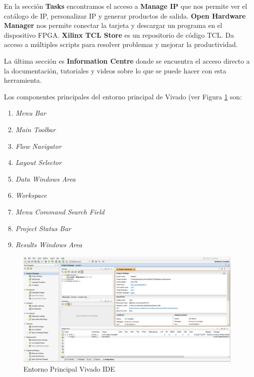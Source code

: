 En la sección \textbf{Tasks} encontramos el acceso a \textbf{Manage IP} que nos permite ver el catálogo de IP, personalizar IP y generar 
productos de salida.  \textbf{Open Hardware Manager} nos permite conectar la tarjeta y descargar un programa en el dispositivo FPGA. 
\textbf{Xilinx TCL Store} es un repositorio de código TCL. Da acceso a múltiples scripts para resolver problemas y mejorar la productividad.

La última sección es \textbf{Information Centre} donde se encuentra el acceso directo a la documentación, tutoriales y videos sobre lo que se 
puede hacer con esta herramienta.

Los componentes principales del entorno principal de Vivado (ver Figura \ref{vivado2} son:
\begin{enumerate}
    \item \textit{Menu Bar}
    \item \textit{Main Toolbar}
    \item \textit{Flow Navigator}
    \item \textit{Layout Selector}
    \item \textit{Data Windows Area}
    \item \textit{Workspace} 
    \item \textit{Menu Command Search Field} 
    \item \textit{Project Status Bar} 
    \item \textit{Results Windows Area}
\end{enumerate}

\begin{figure}[H]
    \centering
    \includegraphics[width = 1\textwidth]{imagenes/vivado2.png}
    \caption{Entorno Principal Vivado IDE}\label{vivado2}
\end{figure}


